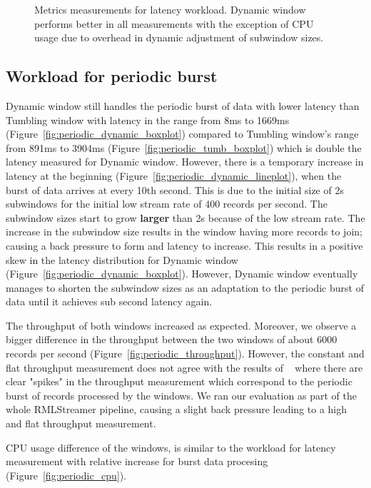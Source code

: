 \begin{figure}[htbp]
    \caption[Metrics measurements for latency workload.]
    {Metrics measurements for latency workload. Dynamic window performs 
    better in all measurements with the exception of CPU usage due to
overhead in dynamic adjustment of subwindow sizes.}%
    \label{fig:constant_measurement}
\end{figure}

\subsection{Workload for periodic burst}%
\label{sec:Results Workload for periodic burst}

Dynamic window still handles the periodic burst of data with lower latency 
than Tumbling window with latency in the range from 8ms to 1669ms
(Figure~\ref{fig:periodic_dynamic_boxplot}) compared to 
Tumbling window's range from 891ms to 3904ms 
(Figure~\ref{fig:periodic_tumb_boxplot}) which is double the latency 
measured for Dynamic window.
However, there is a temporary increase in latency at the beginning 
(Figure~\ref{fig:periodic_dynamic_lineplot}), 
when the burst of data arrives at every 10th second. 
This is due to the initial size of 2s subwindows for the initial low stream rate of 400 records per second. 
The subwindow sizes start to grow \textbf{larger} than 2s because of the low stream rate. 
The increase in the subwindow size results in the 
window having more records to join; causing a back pressure to form and latency to increase.  
This results in a positive skew in the latency distribution for Dynamic window (Figure~\ref{fig:periodic_dynamic_boxplot}). 
However, Dynamic window eventually manages to shorten the subwindow sizes as an
adaptation to the periodic burst of data until it achieves sub second latency again.


The throughput of both windows increased as expected.
Moreover, we observe a bigger difference in the throughput between the 
two windows of about 6000 records per second 
(Figure~\ref{fig:periodic_throughput}). However, the
constant and flat throughput measurement does not agree 
with the results of ~\cite{evalution_of_spe} where there are clear "spikes" in 
the throughput measurement which correspond to the periodic burst 
of records processed by the windows. 
We ran our evaluation as part of the whole RMLStreamer pipeline, causing 
a slight back pressure 
leading to a high and flat throughput measurement. 

CPU usage difference of the windows, is similar to the 
workload for latency measurement with relative increase for 
burst data procesing
(Figure~\ref{fig:periodic_cpu}). 

